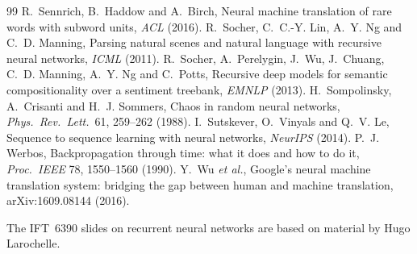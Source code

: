 \documentclass[11pt]{article}
\begin{document}
\begin{thebibliography}{99}
 R.~Sennrich, B.~Haddow and A.~Birch, Neural machine translation of rare words with subword units, \emph{ACL} (2016).
 R.~Socher, C.~C.-Y. Lin, A.~Y. Ng and C.~D. Manning, Parsing natural scenes and natural language with recursive neural networks, \emph{ICML} (2011).
 R.~Socher, A.~Perelygin, J.~Wu, J.~Chuang, C.~D. Manning, A.~Y. Ng and C.~Potts, Recursive deep models for semantic compositionality over a sentiment treebank, \emph{EMNLP} (2013).
 H.~Sompolinsky, A.~Crisanti and H.~J. Sommers, Chaos in random neural networks, \emph{Phys.\ Rev.\ Lett.}\ 61, 259--262 (1988).
 I.~Sutskever, O.~Vinyals and Q.~V. Le, Sequence to sequence learning with neural networks, \emph{NeurIPS} (2014).
 P.~J. Werbos, Backpropagation through time: what it does and how to do it, \emph{Proc.\ IEEE} 78, 1550--1560 (1990).
 Y.~Wu \emph{et al.}, Google's neural machine translation system: bridging the gap between human and machine translation, arXiv:1609.08144 (2016).
\end{thebibliography}

\SourceNote
{\footnotesize\color{mute}The IFT~6390 slides on recurrent neural networks are based on material by Hugo Larochelle.\par}
\end{document}
